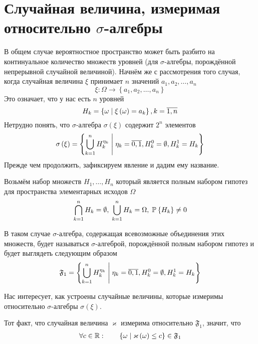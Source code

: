 \section{Случайная величина, измеримая относительно $\sigma$-алгебры}
В общем случае вероятностное пространство может быть разбито
на континуальное количество множеств уровней
(для $\sigma$-алгебры, порождённой непрерывной случайной величиной).
Начнём же с рассмотрения того случая,
когда случайная величина $\xi$ принимает $n$ значений
$a_1, a_2, \dots, a_n$
$$\xi: \Omega \rightarrow \left\{ a_1, a_2, \dots, a_n \right\}$$
Это означает, что у нас есть $n$ уровней
$$H_k = \left\{ \omega \;\middle|\; \xi\left( \omega \right) = a_k \right\},
  k= \overline{1,n}$$
Нетрудно понять,
что $\sigma$-алгебра $\sigma\left( \xi \right)$ содержит $2^n$ элементов
$$\sigma\left( \xi \right) = \left\{ \bigcup_{k=1}^n H_k^{\eta_k}
  \;\middle|\; \eta_k = \overline{0,1}, H_k^0 = \emptyset, H_k^1 = H_k \right\}$$
Прежде чем продолжить, зафиксируем явление и дадим ему название.

\begin{definition}
  Возьмём набор множеств $H_1, \dots, H_n$ который является полным набором
  гипотез для пространства элементарных исходов $\Omega$
  $$\bigcap_{k=1}^n H_k = \emptyset,\; \bigcup_{k=1}^n H_k = \Omega,\;
      \mathbb{P}_{{}}\left\{ H_k \right\} \neq 0$$

  В таком случае $\sigma$-алгебра, содержащая всевозможные объединения этих
  множеств, будет называться $\sigma$-алгеброй, порождённой полным набором
  гипотез и будет выглядеть следующим образом
  $$\mathfrak{F}_1 = \left\{ \bigcup_{k=1}^n H_k^{\eta_k}
      \;\middle|\; \eta_k = \overline{0,1},
      H_k^0 = \emptyset, H_k^1 = H_k \right\}$$
\end{definition}

Нас интересует, как устроены случайные величины,
которые измеримы относительно $\sigma$-алгебры $\sigma\left( \xi \right)$.

\begin{definition}
  Тот факт, что случайная величина $\varkappa$ измерима относительно
  $\mathfrak{F}_1$, значит, что
  \begin{align*}
      \forall c \in \mathbb{R}:\qquad
      \left\{ \omega \;\middle|\; \varkappa\left( \omega \right) \le c \right\}
      \in \mathfrak{F}_1
  \end{align*}
\end{definition}

